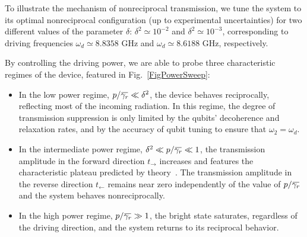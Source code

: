 \documentclass[pra, twocolumn, amsmath, amssymb, notitlepage, longbibliography, showpacs, superscriptaddress]{revtex4-1}
\newcommand{\overbar}[1]{\mkern 1.5mu\overline{\mkern-1.5mu#1\mkern-1.5mu}\mkern 1.5mu}
\begin{document}
To illustrate the mechanism of nonreciprocal transmission, 
we  tune the system to its optimal nonreciprocal configuration (up 
to experimental uncertainties) for two different values of the parameter 
$\delta$: $\delta^2 \simeq 10^{-2}$ and $\delta^2 \simeq 10^{-3}$, 
corresponding to driving frequencies $\omega_{d}\simeq 8.8358\textrm{ GHz}$ 
and $\omega_{d}\simeq 8.6188\textrm{ GHz}$, respectively. 

By controlling the driving power, we are able to probe three 
characteristic regimes of the device, featured in Fig.~\ref{FigPowerSweep}:
\begin{itemize}
	\item In the low power regime, $p/\overbar{\gamma_r}\ll\delta^2$, 
	the device behaves reciprocally, reflecting most of the incoming radiation. 
	In this regime, the degree of transmission suppression is only limited by the 
	qubits' decoherence and relaxation rates, and by the accuracy of qubit tuning
	to ensure that $\omega_2 = \omega_d$.
	\item In the intermediate power regime,   
	$\delta^2\ll p/\overbar{\gamma_r}\ll 1$, the transmission 
	amplitude in the forward direction $t_\rightarrow$ increases and 
	features the characteristic plateau predicted by theory~\cite{Dai2015,Muller2017a}. 
	The transmission amplitude in the reverse direction $t_\leftarrow$ 
	remains near zero independently of the value of $p/\overbar{\gamma_r}$ and the system behaves nonreciprocally. 
	\item In the high power regime, $p/\overbar{\gamma_r}\gg 1$, 
	the bright state saturates, regardless of the driving direction, 
	and the system returns to its reciprocal behavior.
\end{itemize}
\end{document}
